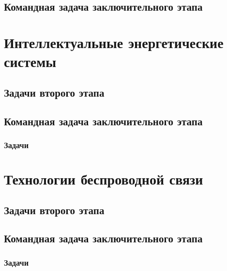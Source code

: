 \documentclass[a4paper,12pt,oneside]{book}
\begin{document}
\chapter{Командная задача заключительного этапа}


\part{Интеллектуальные энергетические системы}
\clearpage
\chapter{Задачи второго этапа}

\clearpage
\chapter{Командная задача заключительного этапа}
\section{Задачи}


\part{Технологии беспроводной связи}
\clearpage
\chapter{Задачи второго этапа}

\clearpage
\chapter{Командная задача заключительного этапа}
\section{Задачи}

\end{document}
